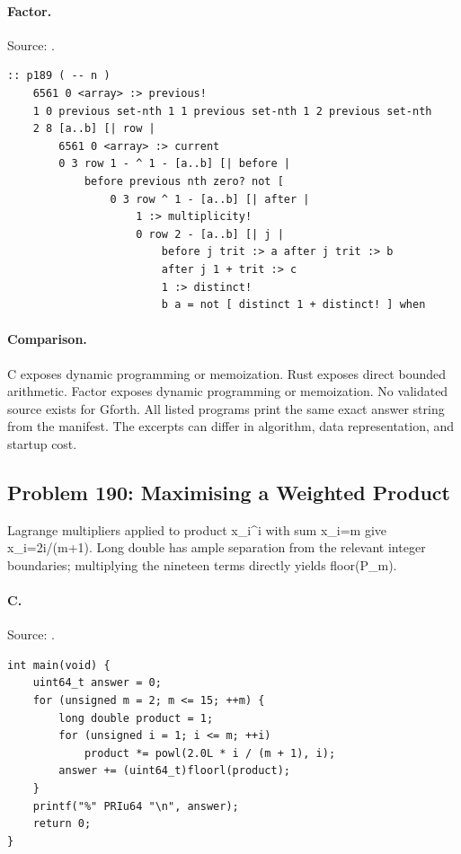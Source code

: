 \paragraph{Factor.} Source: .
\begin{lstlisting}
:: p189 ( -- n )
    6561 0 <array> :> previous!
    1 0 previous set-nth 1 1 previous set-nth 1 2 previous set-nth
    2 8 [a..b] [| row |
        6561 0 <array> :> current
        0 3 row 1 - ^ 1 - [a..b] [| before |
            before previous nth zero? not [
                0 3 row ^ 1 - [a..b] [| after |
                    1 :> multiplicity!
                    0 row 2 - [a..b] [| j |
                        before j trit :> a after j trit :> b
                        after j 1 + trit :> c
                        1 :> distinct!
                        b a = not [ distinct 1 + distinct! ] when
\end{lstlisting}

\paragraph{Comparison.}
C exposes dynamic programming or memoization. Rust exposes direct bounded arithmetic. Factor exposes dynamic programming or memoization.
No validated source exists for Gforth.
All listed programs print the same exact answer string from the manifest. The excerpts can differ in algorithm, data representation, and startup cost.

\subsection{Problem 190: Maximising a Weighted Product}
\label{walkthrough:p190}
Lagrange multipliers applied to product x\_i\textasciicircum{}i with sum x\_i=m give x\_i=2i/(m+1). Long double has ample separation from the relevant integer boundaries; multiplying the nineteen terms directly yields floor(P\_m).

\paragraph{C.} Source: .
\begin{lstlisting}
int main(void) {
    uint64_t answer = 0;
    for (unsigned m = 2; m <= 15; ++m) {
        long double product = 1;
        for (unsigned i = 1; i <= m; ++i)
            product *= powl(2.0L * i / (m + 1), i);
        answer += (uint64_t)floorl(product);
    }
    printf("%" PRIu64 "\n", answer);
    return 0;
}
\end{lstlisting}

